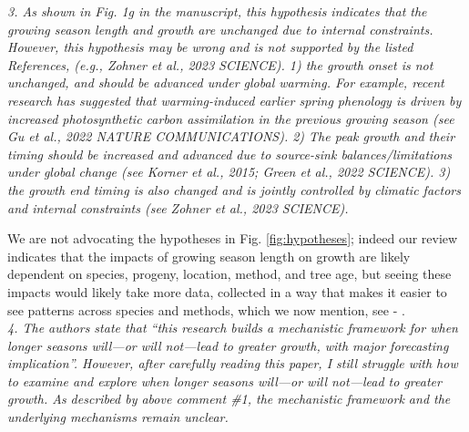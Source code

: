 \documentclass[11pt]{article}
\newcommand{\R}[1]{\label{#1}\linelabel{#1}}
\begin{document}

\emph{3. As shown in Fig. 1g in the manuscript, this hypothesis indicates that the growing season length and growth are unchanged due to internal constraints. However, this hypothesis may be wrong and is not supported by the listed References, (e.g., Zohner et al., 2023 SCIENCE). 1) the growth onset is not unchanged, and should be advanced under global warming. For example, recent research has suggested that warming-induced earlier spring phenology is driven by increased photosynthetic carbon assimilation in the previous growing season (see Gu et al., 2022 NATURE COMMUNICATIONS). 2) The peak growth and their timing should be increased and advanced due to source-sink balances/limitations under global change (see Korner et al., 2015; Green et al., 2022 SCIENCE). 3) the growth end timing is also changed and is jointly controlled by climatic factors and internal constraints (see Zohner et al., 2023 SCIENCE).}

We are not advocating the hypotheses in Fig. \ref{fig:hypotheses}; indeed our review indicates that the impacts of growing season length on growth are likely dependent on species, progeny, location, method, and tree age, but seeing these impacts would likely take more data, collected in a way that makes it easier to see patterns across species and methods, which we now mention, see  \R{R2complaint3S}- \R{R2complaint3E}.\\ %

\emph{4. The authors state that ``this research builds a mechanistic framework for when longer seasons will---or will not---lead to greater growth, with major forecasting implication''. However, after carefully reading this paper, I still struggle with how to examine and explore when longer seasons will---or will not---lead to greater growth. As described by above comment \#1, the mechanistic framework and the underlying mechanisms remain unclear.}
\end{document}
